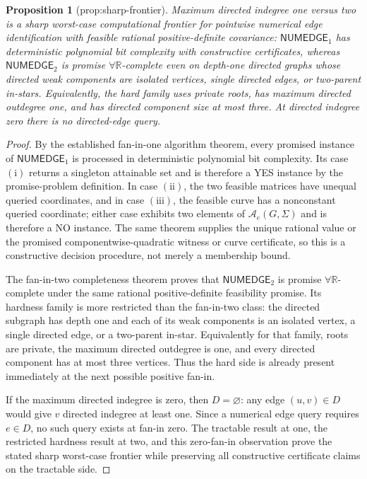 \documentclass{article}
\newtheorem{proposition}{Proposition}
\begin{document}
\begin{proposition}[prop:sharp-frontier]\label{prop:sharp-frontier}
Maximum directed indegree one versus two is a sharp worst-case computational frontier for pointwise numerical edge identification with feasible rational positive-definite covariance: \(\mathsf{NUMEDGE}_1\) has deterministic polynomial bit complexity with constructive certificates, whereas \(\mathsf{NUMEDGE}_2\) is promise \(\forall\mathbb R\)-complete even on depth-one directed graphs whose directed weak components are isolated vertices, single directed edges, or two-parent in-stars.  Equivalently, the hard family uses private roots, has maximum directed outdegree one, and has directed component size at most three.  At directed indegree zero there is no directed-edge query.
\end{proposition}
\begin{proof}
By the established fan-in-one algorithm theorem, every promised instance of \(\mathsf{NUMEDGE}_1\) is processed in deterministic polynomial bit complexity.  Its case \(\mathrm{(i)}\) returns a singleton attainable set and is therefore a YES instance by the promise-problem definition.  In case \(\mathrm{(ii)}\), the two feasible matrices have unequal queried coordinates, and in case \(\mathrm{(iii)}\), the feasible curve has a nonconstant queried coordinate; either case exhibits two elements of \(\mathcal A_e(G,\Sigma)\) and is therefore a NO instance.  The same theorem supplies the unique rational value or the promised componentwise-quadratic witness or curve certificate, so this is a constructive decision procedure, not merely a membership bound.

The fan-in-two completeness theorem proves that \(\mathsf{NUMEDGE}_2\) is promise \(\forall\mathbb R\)-complete under the same rational positive-definite feasibility promise.  Its hardness family is more restricted than the fan-in-two class: the directed subgraph has depth one and each of its weak components is an isolated vertex, a single directed edge, or a two-parent in-star.  Equivalently for that family, roots are private, the maximum directed outdegree is one, and every directed component has at most three vertices.  Thus the hard side is already present immediately at the next possible positive fan-in.

If the maximum directed indegree is zero, then \(D=\varnothing\): any edge \((u,v)\in D\) would give \(v\) directed indegree at least one.  Since a numerical edge query requires \(e\in D\), no such query exists at fan-in zero.  The tractable result at one, the restricted hardness result at two, and this zero-fan-in observation prove the stated sharp worst-case frontier while preserving all constructive certificate claims on the tractable side.
\end{proof}
\end{document}
